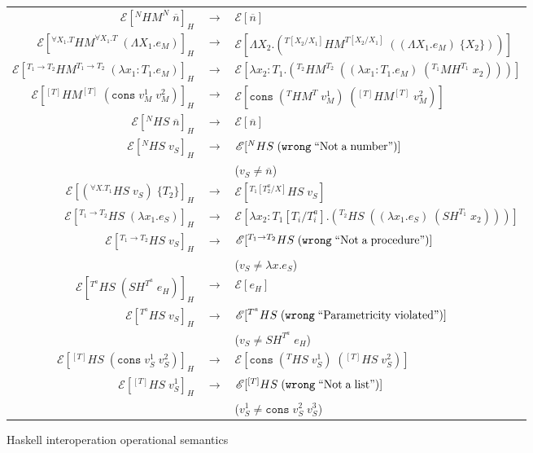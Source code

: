 \begin{figure}
\onehalfspacing
\begin{center}
\begin{tabular}{rcl}
$\mathscr{E}[^{N}HM^{N}\;\overline{n}]_{H}$ & $\rightarrow$ & $\mathscr{E}[\overline{n}]$ \\
$\mathscr{E}[^{\forall X_{1}.T}HM^{\forall X_{1}.T}\;(\Lambda X_{1}.e_{M})]_{H}$ & $\rightarrow$ & $\mathscr{E}[\Lambda X_{2}.(^{T[X_{2}/X_{1}]}HM^{T[X_{2}/X_{1}]}\;((\Lambda X_{1}.e_{M})\;\lbrace X_{2}\rbrace))]$ \\
$\mathscr{E}[^{T_{1}\rightarrow T_{2}}HM^{T_{1}\rightarrow T_{2}}\;(\lambda x_{1}:T_{1}.e_{M})]_{H}$ & $\rightarrow$ & $\mathscr{E}[\lambda x_{2}:T_{1}.(^{T_{2}}HM^{T_{2}}\;((\lambda x_{1}:T_{1}.e_{M})\;(^{T_{1}}MH^{T_{1}}\;x_{2})))]$ \\
$\mathscr{E}[^{[T]}HM^{[T]}\;(\mathtt{cons}\;v_{M}^{1}\;v_{M}^{2})]_{H}$ & $\rightarrow$ & $\mathscr{E}[\mathtt{cons}\;(^{T}HM^{T}\;v_{M}^{1})\;(^{[T]}HM^{[T]}\;v_{M}^{2})]$ \\
$\mathscr{E}[^{N}HS\;\overline{n}]_{H}$ & $\rightarrow$ & $\mathscr{E}[\overline{n}]$ \\
$\mathscr{E}[^{N}HS\;v_{S}]_{H}$ & $\rightarrow$ & $\mathscr{E}[^{N}HS\;(\mathtt{wrong}\;\mathrm{``Not\;a\;number"})]$ \\
&& ($v_{S}\neq\overline{n}$) \\
$\mathscr{E}[(^{\forall X.T_{1}}HS\;v_{S})\;\lbrace T_{2}\rbrace]_{H}$ & $\rightarrow$ & $\mathscr{E}[^{T_{1}[T^{a}_{2}/X]}HS\;v_{S}]$ \\
$\mathscr{E}[^{T_{1}\rightarrow T_{2}}HS\;(\lambda x_{1}.e_{S})]_{H}$ & $\rightarrow$ & $\mathscr{E}[\lambda x_{2}:T_{1}[T_{i}/T^{a}_{i}].(^{T_{2}}HS\;((\lambda x_{1}.e_{S})\;(SH^{T_{1}}\;x_{2})))]$ \\
$\mathscr{E}[^{T_{1}\rightarrow T_{2}}HS\;v_{S}]_{H}$ & $\rightarrow$ & $\mathscr{E}[^{T_{1}\rightarrow T_{2}}HS\;(\mathtt{wrong}\;\mathrm{``Not\;a\;procedure"})]$ \\
&& ($v_{S}\neq\lambda x.e_{S}$) \\
$\mathscr{E}[^{T^{a}}HS\;(SH^{T^{a}}\;e_{H})]_{H}$ & $\rightarrow$ & $\mathscr{E}[e_{H}]$ \\
$\mathscr{E}[^{T^{a}}HS\;v_{S}]_{H}$ & $\rightarrow$ & $\mathscr{E}[^{T^{a}}HS\;(\mathtt{wrong}\;\mathrm{``Parametricity\;violated"})]$ \\
&& ($v_{S}\neq SH^{T^{a}}\;e_{H}$) \\
$\mathscr{E}[^{[T]}HS\;(\mathtt{cons}\;v_{S}^{1}\;v_{S}^{2})]_{H}$ & $\rightarrow$ & $\mathscr{E}[\mathtt{cons}\;(^{T}HS\;v_{S}^{1})\;(^{[T]}HS\;v_{S}^{2})]$ \\
$\mathscr{E}[^{[T]}HS\;v_{S}^{1}]_{H}$ & $\rightarrow$ & $\mathscr{E}[^{[T]}HS\;(\mathtt{wrong}\;\mathrm{``Not\;a\;list"})]$ \\
&& ($v_{S}^{1}\neq\mathtt{cons}\;v_{S}^{2}\;v_{S}^{3}$)
\end{tabular}
\end{center}
\caption{Haskell interoperation operational semantics}
\label{fig:hios}
\end{figure}